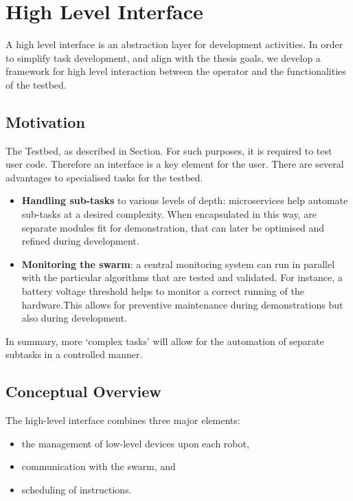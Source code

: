 \pagebreak
\section{High Level Interface}\label{section:SPI}

A high level interface is an abstraction layer for development activities. In order to simplify task development, and align with the thesis goals, we develop a framework for high level interaction between the operator and the functionalities of the testbed.

\subsection{Motivation}

The Testbed, as described in Section. For such purposes, it is required to test user code. Therefore an interface is a key element for the user. There are several advantages to specialised tasks for the testbed.

\begin{itemize}
    \item	\textbf{Handling sub-tasks} to various levels of depth: microservices help automate sub-tasks at a desired complexity. When encapsulated in this way, are separate modules fit for demonstration, that can later be optimised and refined during development.

    \item	\textbf{Monitoring the swarm}: a central monitoring system can run in parallel with the particular algorithms that are tested and validated. For instance, a battery voltage threshold helps to monitor a correct running of the hardware.This allows for preventive maintenance during demonstrations but also during development.
\end{itemize}

In summary, more ‘complex tasks’ will allow for the automation of separate subtasks in a controlled manner.

\subsection{Conceptual Overview}

The high-level interface combines three major elements: 
\begin{itemize}
    \item the management of low-level devices upon each robot,
    \item communication with the swarm, and
    \item scheduling of instructions.
\end{itemize} 

